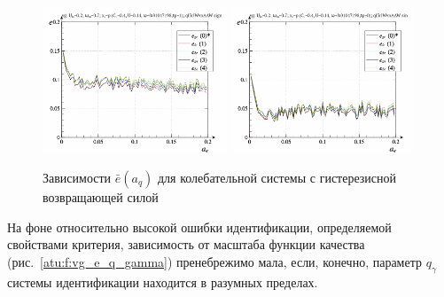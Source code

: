 \begin{figure}[ht!]
\begin{center}
  \includegraphics[width=0.49\textwidth]{p/cha/vg/vg_id-p_a_q_sign.png}
  \hfill
  \includegraphics[width=0.49\textwidth]{p/cha/vg/vg_id-p_a_q_sin.png}
\end{center}
  \caption{Зависимости $\bar{e}(a_q)$ для колебательной системы с гистерезисной возвращающей силой}
\label{atu:f:vg_e_a_q}
\end{figure}

На фоне относительно высокой ошибки идентификации,
определяемой свойствами критерия,
зависимость от масштаба функции качества
(рис.~\ref{atu:f:vg_e_q_gamma})
пренебрежимо мала, если, конечно,
параметр $q_\gamma$ системы идентификации
находится в разумных пределах.

